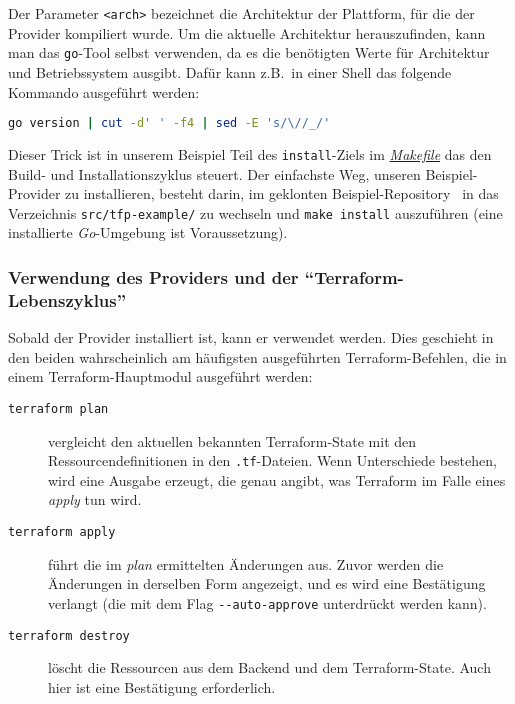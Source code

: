 \documentclass[paper=a4,11pt,numbers=noenddot]{article}
\begin{document}
Der Parameter \verb'<arch>' bezeichnet die Architektur der Plattform, für die der Provider kompiliert wurde. Um die aktuelle Architektur herauszufinden, kann man das \verb'go'-Tool selbst verwenden, da es die benötigten Werte für Architektur und Betriebssystem ausgibt. Dafür kann z.B.\ in einer Shell das folgende Kommando ausgeführt werden:

\begin{lstlisting}[language=bash,basicstyle=\ttfamily\footnotesize,numbers=none]
go version | cut -d' ' -f4 | sed -E 's/\//_/'
\end{lstlisting}

Dieser Trick ist in unserem Beispiel Teil des \verb'install'-Ziels im \href{https://github.com/ecky-l/terraform-provider-example/blob/main/src/tfp-example/Makefile}{\emph{Makefile}} das den Build- und Installationszyklus steuert. Der einfachste Weg, unseren Beispiel-Provider zu installieren, besteht darin, im geklonten Beispiel-Repository~\autocite{ecky-l_terraform-provider-example_nodate} in das Verzeichnis \verb'src/tfp-example/' zu wechseln und \verb'make install' auszuführen (eine installierte \emph{Go}-Umgebung ist Voraussetzung).

\subsubsection{Verwendung des Providers und der ``Terraform-Lebenszyklus''}
\label{subsubsec:prov-usage-terr}

Sobald der Provider installiert ist, kann er verwendet werden. Dies geschieht in den beiden wahrscheinlich am häufigsten ausgeführten Terraform-Befehlen, die in einem Terraform-Hauptmodul ausgeführt werden:

\begin{description}
\item[\texttt{terraform plan}] vergleicht den aktuellen bekannten Terraform-State mit den Ressourcendefinitionen in den \verb'.tf'-Dateien. Wenn Unterschiede bestehen, wird eine Ausgabe erzeugt, die genau angibt, was Terraform im Falle eines \emph{apply} tun wird.
\item[\texttt{terraform apply}] führt die im \emph{plan} ermittelten Änderungen aus. Zuvor werden die Änderungen in derselben Form angezeigt, und es wird eine Bestätigung verlangt (die mit dem Flag \verb'--auto-approve' unterdrückt werden kann).
\item[\texttt{terraform destroy}] löscht die Ressourcen aus dem Backend und dem Terraform-State. Auch hier ist eine Bestätigung erforderlich.
\end{description}
\end{document}
